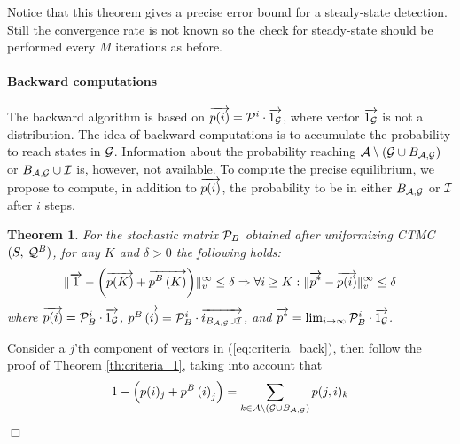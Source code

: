 \documentclass[a4paper,11pt]{article}
\newtheorem{theorem}{Theorem}
\newenvironment{proof}{\trivlist \item[\hskip \labelsep{\bf Proof}]}{\hfill\hbox{$\Box$}\endtrivlist}
\begin{document}
	Notice that this theorem gives a precise error bound for a steady-state detection. Still the convergence rate is not known so the check for steady-state should be performed every $M$ iterations as before.
	
	\paragraph{Backward computations}	 
	The backward algorithm is based on $\overrightarrow{p(i)} = \mathcal{P}^{i} \cdot \overrightarrow{1_{\mathcal{G}}}$, where vector $\overrightarrow{1_{\mathcal{G}}}$ is not a distribution. The idea of backward computations is to accumulate the probability to reach states in $\mathcal{G}$. Information about the probability reaching $\mathcal{A} \setminus \left( \mathcal{G} \cup B_{ \mathcal{A}, \mathcal{G} } \right)$ or $B_{ \mathcal{A}, \mathcal{G} } \cup \mathcal{I}$ is, however, not available. To compute the precise equilibrium, we propose to compute, in addition to $\overrightarrow{p(i)}$, the probability to be in either $B_{ \mathcal{A}, \mathcal{G} }$ or $\mathcal{I}$ after $i$ steps.
	
	\begin{theorem}
		For the stochastic matrix $\mathcal{P}_{B}$ obtained after uniformizing CTMC $(S,\:\mathcal{Q}^{B})$, for any $K$ and $\delta > 0$ the following holds:
			\begin{equation}
				\lVert   \overrightarrow{1} - \left( \overrightarrow{p(K)} + \overrightarrow{p^{B}\left( K \right)} \right)   \rVert_{v}^{\infty} \leq \delta \Rightarrow \forall i \geq K : \lVert  \overrightarrow{p^{*}} - \overrightarrow{p(i)}  \rVert_{v}^{\infty} \leq \delta
				\label{eq:criteria_back}
			 \end{equation}
		where $\overrightarrow{p(i)} = \mathcal{P}_{B}^{i} \cdot \overrightarrow{1_{\mathcal{G}}}$, $\overrightarrow{p^{B}\left( i \right)} = \mathcal{P}_{B}^{i} \cdot \overrightarrow {i_{B_{ \mathcal{A}, \mathcal{G} } \cup \mathcal{I}}}$, and $\overrightarrow{p^{*}} = \lim_{i \rightarrow \infty} \mathcal{P}_{B}^{i} \cdot \overrightarrow{1_{\mathcal{G}}}$. \label{th:criteria_2}
	\end{theorem}
	\begin{proof}
		Consider a $j$'th component of vectors in (\ref{eq:criteria_back}), then follow the proof of Theorem \ref{th:criteria_1}, taking into account that 
		\begin{equation}
			1 - \left( p(i)_{j} + p^{B}\left( i \right)_{j} \right) = \sum_{k \in \mathcal{A} \setminus \left( \mathcal{G} \cup B_{ \mathcal{A}, \mathcal{G} } \right)} p(j,i)_{k} \nonumber
		\end{equation}
	\end{proof}
	
\end{document}
